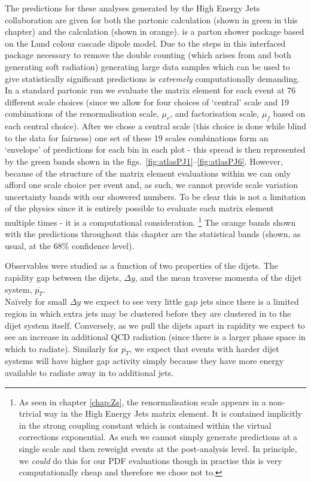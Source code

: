 	The predictions for these analyses generated by the High Energy Jets collaboration
	are given for both the partonic \HEJ calculation (shown in green in this chapter)
	and the \HEJA calculation (shown in orange).
	\ARIADNE is a parton shower package based on the Lund colour cascade dipole model.
	Due to the steps in this interfaced package necessary to remove the double counting
	(which arises from \HEJ and \ARIADNE both generating soft radiation) generating large
	data samples which can be used to give statistically significant predictions is
	\emph{extremely} computationally demanding.  In a standard partonic \HEJ run we
	evaluate the matrix element for each event at 76 different scale choices (since
	we allow for four choices of `central' scale and 19 combinations of the renormalisation
	scale, $\mu_r$, and factorisation scale, $\mu_f$ based on each central choice).
	After we chose a central scale (this choice is done while blind to the data for
	fairness) one set of these 19 scales combinations form an `envelope' of predictions
	for each bin in each plot - this spread is then represented by the green bands shown
	in the figs.~\eqref{fig:atlasPJ1}--\eqref{fig:atlasPJ6}.
	However, because of the structure of the matrix element evaluations within \HEJA
	we can only afford one scale choice per event and, as such, we cannot provide
	scale variation uncertainty bands with our showered numbers.  To be clear this
	is not a limitation of the physics since it is entirely possible to evaluate
	each matrix element multiple times - it is a computational consideration. \footnote{
	As seen in chapter \eqref{chap:Zs}, the renormalisation scale appears in a non-trivial way
	in the High Energy Jets matrix element.  It is contained implicitly in the strong coupling
	constant which is contained within the virtual corrections exponential.  As such
	we cannot simply generate predictions at a single scale and then reweight events
	at the post-analysis level.  In principle, we \emph{could} do this for our PDF
	evaluations though in practise this is very computationally cheap and therefore we
	chose not to.}  The orange bands shown with the \HEJA predictions throughout this
	chapter are the statistical bands (shown, as usual, at the 68\% confidence level).

	Observables were studied
	as a function of two properties of the dijets.  The rapidity gap between the dijets,
	$\Delta y$, and the mean traverse momenta of the dijet system, $\overline{p_T}$.\\
	Na\"ively for small $\Delta y$ we expect to see very little gap jets since there is
	a limited region in which extra jets may be clustered before they are clustered in
	to the dijet system itself.   Conversely, as we pull the dijets apart in rapidity
	we expect to see an increase in additional QCD radiation (since there is a larger
	phase space in which to radiate).  Similarly for $\overline{p_T}$, we expect that
	events with harder dijet systems will have higher gap activity simply because they
	have more energy available to radiate away in to additional jets.

